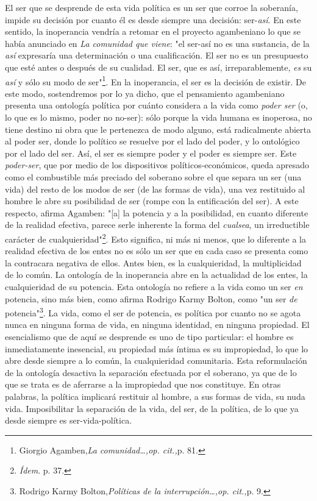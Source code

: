 \documentclass{book}
\begin{document}
El ser que se desprende de esta vida política es un ser que corroe la
soberanía, impide su decisión por cuanto él es desde siempre una
decisión: ser-\emph{así}. En este sentido, la inoperancia vendría a
retomar en el proyecto agambeniano lo que se había anunciado en \emph{La
comunidad que viene}: "el ser-así no es una sustancia, de la \emph{así}
expresaría una determinación o una cualificación. El ser no es un
presupuesto que esté antes o después de su cualidad. El ser, que es así,
irreparablemente, \emph{es} su \emph{así} y sólo su modo de
ser"\footnote{Giorgio Agamben,\emph{La comunidad\ldots,op. cit.,}p. 81.}.
En la inoperancia, el ser es la decisión de existir. De este modo,
sostendremos por lo ya dicho, que el pensamiento agambeniano presenta
una ontología política por cuánto considera a la vida como \emph{poder
ser} (o, lo que es lo mismo, poder no no-ser): sólo porque la vida
humana es inoperosa, no tiene destino ni obra que le pertenezca de modo
alguno, está radicalmente abierta al poder ser, donde lo político se
resuelve por el lado del poder, y lo ontológico por el lado del ser.
Así, el ser es siempre poder y el poder es siempre ser. Este
\emph{poder-ser}, que por medio de los dispositivos
políticos-económicos, queda apresado como el combustible más preciado
del soberano sobre el que separa un ser (una vida) del resto de los
modos de ser (de las formas de vida), una vez restituido al hombre le
abre su posibilidad de ser (rompe con la entificación del ser). A este
respecto, afirma Agamben: "{[}a{]} la potencia y a la posibilidad, en
cuanto diferente de la realidad efectiva, parece serle inherente la
forma del \emph{cualsea}, un irreductible carácter de
cualquieridad"\footnote{\emph{Ídem}. p. 37.}. Esto significa, ni más ni
menos, que lo diferente a la realidad efectiva de los entes no es sólo
un ser que en cada caso se presenta como la contracara negativa de
ellos. Antes bien, es la cualquieridad, la multiplicidad de lo común. La
ontología de la inoperancia abre en la actualidad de los entes, la
cualquieridad de su potencia. Esta ontología no refiere a la vida como
un ser \emph{en} potencia, sino más bien, como afirma Rodrigo Karmy
Bolton, como "un ser \emph{de} potencia"\footnote{Rodrigo Karmy
  Bolton,\emph{Políticas de la interrupción\ldots,op. cit.,}p. 9.}. La
vida, como el ser de potencia, es política por cuanto no se agota nunca
en ninguna forma de vida, en ninguna identidad, en ninguna propiedad. El
esencialismo que de aquí se desprende es uno de tipo particular: el
hombre es inmediatamente inesencial, su propiedad más íntima es su
impropiedad, lo que lo abre desde siempre a lo común, la cualquieridad
comunitaria. Esta reformulación de la ontología desactiva la separación
efectuada por el soberano, ya que de lo que se trata es de aferrarse a
la impropiedad que nos constituye. En otras palabras, la política
implicará restituir al hombre, a sus formas de vida, su nuda vida.
Imposibilitar la separación de la vida, del ser, de la política, de lo
que ya desde siempre es ser-vida-política.
\end{document}

